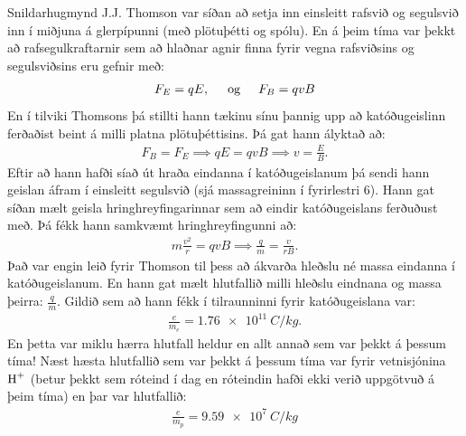 \ifdefined \wholebook \else\documentclass[oneside]{book}\usepackage{EdlBook}\graphicspath{{figures/}}
\begin{document}
Snildarhugmynd J.J. Thomson var síðan að setja inn einsleitt rafsvið og segulsvið inn í miðjuna á glerpípunni (með plötuþétti og spólu). En á þeim tíma var þekkt að rafsegulkraftarnir sem að hlaðnar agnir finna fyrir vegna rafsviðsins og segulsviðsins eru gefnir með:
\begin{align*}
    F_E = qE, \hspace{0.5cm} \text{og} \hspace{0.5cm} F_B = qvB
\end{align*}
En í tilviki Thomsons þá stillti hann tækinu sínu þannig upp að katóðugeislinn ferðaðist beint á milli platna plötuþéttisins. Þá gat hann ályktað að:
\begin{align*}
    F_B = F_E \implies qE = qvB \implies v = \frac{E}{B}.
\end{align*}
Eftir að hann hafði síað út hraða eindanna í katóðugeislanum þá sendi hann geislan áfram í einsleitt segulsvið (sjá massagreininn í fyrirlestri 6). Hann gat síðan mælt geisla hringhreyfingarinnar sem að eindir katóðugeislans ferðuðust með. Þá fékk hann samkvæmt hringhreyfingunni að:
\begin{align*}
    m\frac{v^2}{r} = qvB \implies \frac{q}{m} = \frac{v}{rB}.
\end{align*}
Það var engin leið fyrir Thomson til þess að ákvarða hleðslu né massa eindanna í katóðugeislanum. En hann gat mælt hlutfallið milli hleðslu eindnana og massa þeirra: $\frac{q}{m}$. Gildið sem að hann fékk í tilraunninni fyrir katóðugeislana var:
\begin{align*}
    \frac{e}{m_e} = \SI{1.76e11}{C/kg}.
\end{align*}
En þetta var miklu hærra hlutfall heldur en allt annað sem var þekkt á þessum tíma! Næst hæsta hlutfallið sem var þekkt á þessum tíma var fyrir vetnisjónina $\ce{H+}$ (betur þekkt sem róteind í dag en róteindin hafði ekki verið uppgötvuð á þeim tíma) en þar var hlutfallið:
\begin{align*}
    \frac{e}{m_p} = \SI{9.59e7}{C/kg}
\end{align*}
\end{document}
